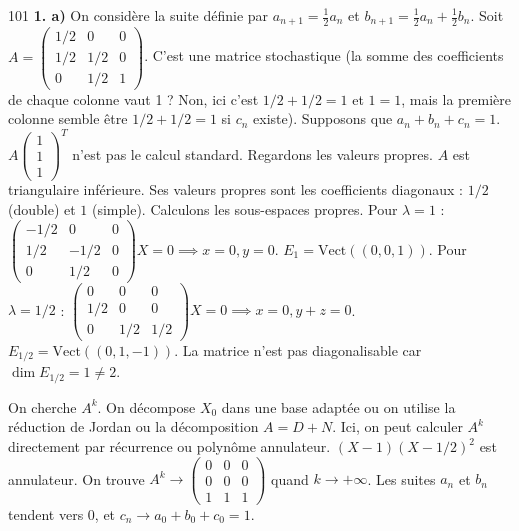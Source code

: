 \begin{correction}{101}
\textbf{1. a)}
On considère la suite définie par $a_{n+1} = \frac{1}{2}a_n$ et $b_{n+1} = \frac{1}{2}a_n + \frac{1}{2}b_n$.
Soit $A = \begin{pmatrix} 1/2 & 0 & 0 \\ 1/2 & 1/2 & 0 \\ 0 & 1/2 & 1 \end{pmatrix}$.
C'est une matrice stochastique (la somme des coefficients de chaque colonne vaut 1 ? Non, ici c'est $1/2+1/2=1$ et $1=1$, mais la première colonne semble être $1/2+1/2=1$ si $c_n$ existe).
Supposons que $a_n+b_n+c_n=1$.
$A \begin{pmatrix} 1 \\ 1 \\ 1 \end{pmatrix}^T$ n'est pas le calcul standard.
Regardons les valeurs propres.
$A$ est triangulaire inférieure. Ses valeurs propres sont les coefficients diagonaux : $1/2$ (double) et $1$ (simple).
Calculons les sous-espaces propres.
Pour $\lambda = 1$ : $\begin{pmatrix} -1/2 & 0 & 0 \\ 1/2 & -1/2 & 0 \\ 0 & 1/2 & 0 \end{pmatrix} X = 0 \implies x=0, y=0$. $E_1 = \text{Vect}((0,0,1))$.
Pour $\lambda = 1/2$ : $\begin{pmatrix} 0 & 0 & 0 \\ 1/2 & 0 & 0 \\ 0 & 1/2 & 1/2 \end{pmatrix} X = 0 \implies x=0, y+z=0$.
$E_{1/2} = \text{Vect}((0, 1, -1))$.
La matrice n'est pas diagonalisable car $\dim E_{1/2} = 1 \ne 2$.

On cherche $A^k$. On décompose $X_0$ dans une base adaptée ou on utilise la réduction de Jordan ou la décomposition $A = D+N$.
Ici, on peut calculer $A^k$ directement par récurrence ou polynôme annulateur.
$(X-1)(X-1/2)^2$ est annulateur.
On trouve $A^k \to \begin{pmatrix} 0 & 0 & 0 \\ 0 & 0 & 0 \\ 1 & 1 & 1 \end{pmatrix}$ quand $k \to + \infty$.
Les suites $a_n$ et $b_n$ tendent vers 0, et $c_n \to a_0+b_0+c_0 = 1$.
\end{correction}

